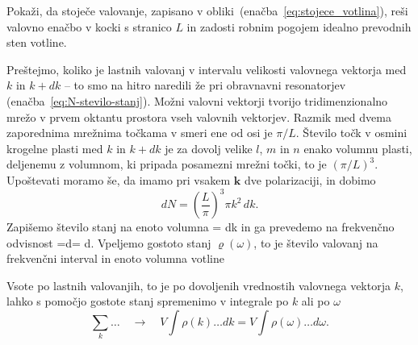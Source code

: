 \begin{definition}
 Pokaži, da stoječe valovanje, zapisano v obliki~(enačba~\ref{eq:stojece_votlina}), reši 
 valovno enačbo v kocki s stranico $L$ in zadosti robnim pogojem idealno prevodnih sten votline.
\end{definition}

Preštejmo, koliko je lastnih valovanj v intervalu velikosti valovnega
vektorja med $k$ in $k+dk$ -- to smo na hitro naredili že pri obravnavni
resonatorjev (enačba~\ref{eq:N-stevilo-stanj}). Možni valovni vektorji tvorijo tridimenzionalno
mrežo v prvem oktantu prostora vseh valovnih vektorjev. Razmik med
dvema zaporednima mrežnima točkama v smeri ene od osi je $\pi/L$.
Število točk v osmini krogelne plasti med $k$ in $k+dk$ je za dovolj
velike $l$, $m$ in $n$ enako volumnu plasti, deljenemu
z volumnom, ki pripada posamezni mrežni točki, to je $(\pi/L)^{3}$.
Upoštevati moramo še, da imamo pri vsakem $\mathbf{k}$ dve polarizaciji, in dobimo
\begin{equation}
dN=\left(\frac{L}{\pi}\right)^{3}\pi k^{2}\, dk.
\label{4.2}
\end{equation}
Zapišemo število stanj na enoto volumna
\beq
{}= dk
\label{4.3}
\eeq
in ga prevedemo na frekvenčno odvisnost
\beq
{}=d\nu = d\omega.
\eeq
Vpeljemo gostoto stanj  $\varrho (\omega)$, to je število valovanj na frekvenčni interval in enoto volumna 
votline

Vsote po lastnih valovanjih, to je po dovoljenih vrednostih valovnega vektorja $k$,
lahko s pomočjo gostote stanj spremenimo v integrale po $k$ ali po $\omega$
\begin{equation}
\sum_{k}\ldots \quad \rightarrow \quad V\int\rho(k)\ldots dk=V\int\rho(\omega)\ldots d\omega.
\label{4.5}
\end{equation}


